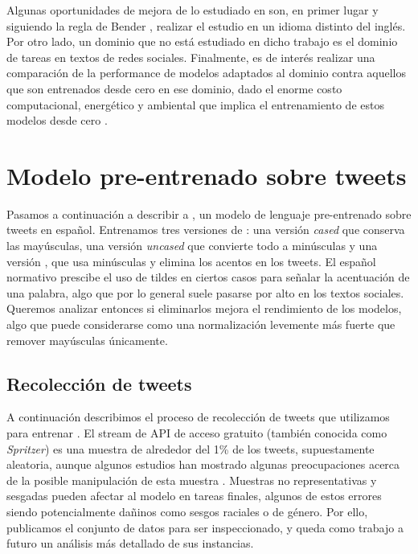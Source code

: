 Algunas oportunidades de mejora de lo estudiado en \citet{gururangan-etal-2020-dont} son, en primer lugar y siguiendo la regla de Bender \cite{bender2011achieving}, realizar el estudio en un idioma distinto del inglés. Por otro lado, un dominio que no está estudiado en dicho trabajo es el dominio de tareas en textos de redes sociales. Finalmente, es de interés realizar una comparación de la performance de modelos adaptados al dominio contra aquellos que son entrenados desde cero en ese dominio, dado el enorme costo computacional, energético y ambiental que implica el entrenamiento de estos modelos desde cero \cite{strubell2019energy}.



\section{Modelo pre-entrenado sobre tweets}
\label{sec:robertuito_pretrained_model}

Pasamos a continuación a describir a \robertuito{}, un modelo de lenguaje pre-entrenado sobre tweets en español. Entrenamos tres versiones de \robertuito{}: una versión \emph{cased} que conserva las mayúsculas, una versión \emph{uncased} que convierte todo a minúsculas y una versión \deacc{}, que usa minúsculas y elimina los acentos en los tweets. El español normativo prescibe el uso de tildes en ciertos casos para señalar la acentuación de una palabra, algo que por lo general suele pasarse por alto en los textos sociales. Queremos analizar entonces si eliminarlos mejora el rendimiento de los modelos, algo que puede considerarse como una normalización levemente más fuerte que remover mayúsculas únicamente.



\subsection{Recolección de tweets}

A continuación describimos el proceso de recolección de tweets que utilizamos para entrenar \robertuito{}. El stream de API de acceso gratuito (también conocida como \emph{Spritzer}) es una muestra de alrededor del 1\% de los tweets, supuestamente aleatoria, aunque algunos estudios han mostrado algunas preocupaciones acerca de la posible manipulación de esta muestra \cite{pfeffer2018tampering}. Muestras no representativas y sesgadas pueden afectar al modelo en tareas finales, algunos de estos errores siendo potencialmente dañinos como sesgos raciales o de género. Por ello, publicamos el conjunto de datos para ser inspeccionado, y queda como trabajo a futuro un análisis más detallado de sus instancias.

